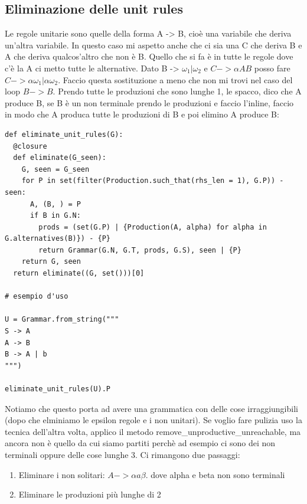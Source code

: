 \subsection{Eliminazione delle unit rules}
Le regole unitarie sono quelle della forma A -> B, cioè una variabile che deriva un'altra variabile. In questo caso mi aspetto anche che ci sia una C che deriva B e A che deriva qualcos'altro che non è B. Quello che si fa è in tutte le regole dove c'è la A ci metto tutte le alternative. Dato B -> $\omega_1 | \omega_2$ e $C -> \alpha A B$ posso fare $C -> \alpha \omega_1 | \alpha \omega_2$. Faccio questa sostituzione a meno che non mi trovi nel caso del loop $B -> B$.
Prendo tutte le produzioni che sono lunghe 1, le spacco, dico che A produce B, se B è un non terminale prendo le produzioni e faccio l'inline, faccio in modo che A produca tutte le produzioni di B e poi elimino A produce B:
\begin{lstlisting}
def eliminate_unit_rules(G):
  @closure
  def eliminate(G_seen):
    G, seen = G_seen
    for P in set(filter(Production.such_that(rhs_len = 1), G.P)) - seen:
      A, (B, ) = P
      if B in G.N:
        prods = (set(G.P) | {Production(A, alpha) for alpha in G.alternatives(B)}) - {P}
        return Grammar(G.N, G.T, prods, G.S), seen | {P}
    return G, seen
  return eliminate((G, set()))[0]

# esempio d'uso

U = Grammar.from_string("""
S -> A
A -> B
B -> A | b
""")

eliminate_unit_rules(U).P
\end{lstlisting}

Notiamo che questo porta ad avere una grammatica con delle cose irraggiungibili (dopo che elminiamo le epsilon regole e i non unitari). Se voglio fare pulizia uso la tecnica dell'altra volta, applico il metodo remove\_unproductive\_unreachable, ma ancora non è quello da cui siamo partiti perchè ad esempio ci sono dei non terminali oppure delle cose lunghe 3.
Ci rimangono due passaggi:
\begin{enumerate}
    \item Eliminare i non solitari: $A -> \alpha a \beta$. dove alpha e beta non sono terminali
    \item Eliminare le produzioni più lunghe di 2
\end{enumerate}

